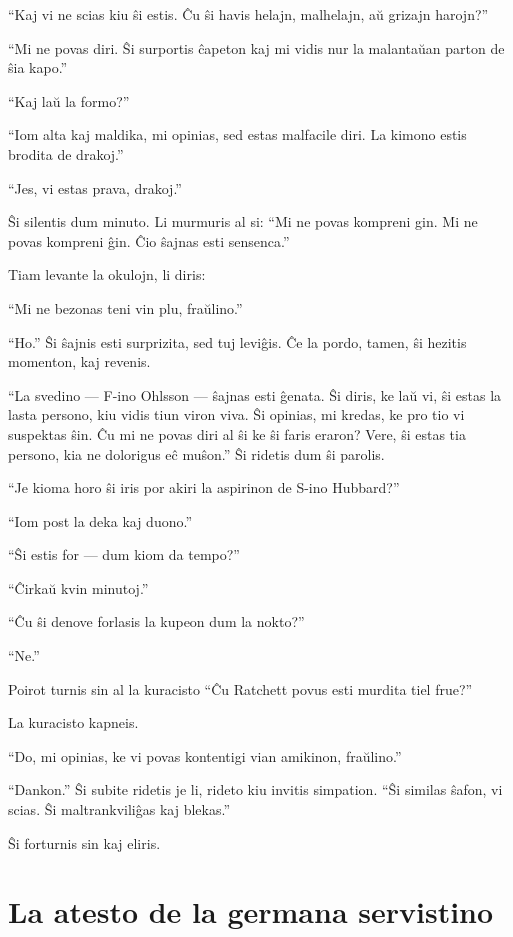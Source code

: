 ``Kaj vi ne scias kiu ŝi estis. Ĉu ŝi havis helajn, malhelajn, aŭ grizajn harojn?''

``Mi ne povas diri. Ŝi surportis ĉapeton kaj mi vidis nur la malantaŭan parton de ŝia kapo.''

``Kaj laŭ la formo?''

``Iom alta kaj maldika, mi opinias, sed estas malfacile diri. La kimono estis brodita de drakoj.''

``Jes, vi estas prava, drakoj.''

Ŝi silentis dum minuto. Li murmuris al si: ``Mi ne povas kompreni gin. Mi ne povas kompreni ĝin. Ĉio ŝajnas esti sensenca.''

Tiam levante la okulojn, li diris:

``Mi ne bezonas teni vin plu, fraŭlino.''

``Ho.'' Ŝi ŝajnis esti surprizita, sed tuj leviĝis. Ĉe la pordo, tamen, ŝi hezitis momenton, kaj revenis.

``La svedino --- F-ino Ohlsson --- ŝajnas esti ĝenata. Ŝi diris, ke laŭ vi, ŝi estas la lasta persono, kiu vidis tiun viron viva. Ŝi opinias, mi kredas, ke pro tio vi suspektas ŝin. Ĉu mi ne povas diri al ŝi ke ŝi faris eraron? Vere, ŝi estas tia persono, kia ne dolorigus eĉ muŝon.'' Ŝi ridetis dum ŝi parolis.

``Je kioma horo ŝi iris por akiri la aspirinon de S-ino Hubbard?''

``Iom post la deka kaj duono.''

``Ŝi estis for --- dum kiom da tempo?''

``Ĉirkaŭ kvin minutoj.''

``Ĉu ŝi denove forlasis la kupeon dum la nokto?''

``Ne.''

Poirot turnis sin al la kuracisto ``Ĉu Ratchett povus esti murdita tiel frue?''

La kuracisto kapneis.

``Do, mi opinias, ke vi povas kontentigi vian amikinon, fraŭlino.''

``Dankon.'' Ŝi subite ridetis je li, rideto kiu invitis simpation. ``Ŝi similas ŝafon, vi scias. Ŝi maltrankviliĝas kaj blekas.''

Ŝi forturnis sin kaj eliris.

\chapter[La atesto de la germana servistino]{La atesto de la germana servistino}


